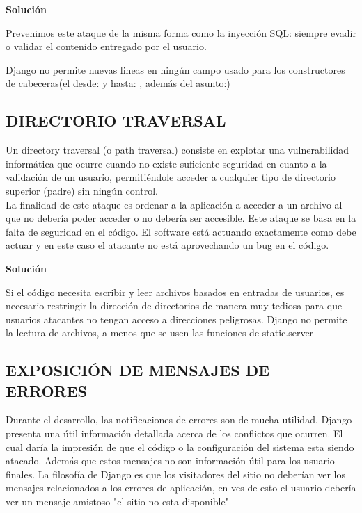 \textbf{Solución}

Prevenimos este ataque de la misma forma como la inyección SQL: siempre evadir o validar el contenido entregado por el usuario.

Django no permite nuevas lineas en ningún campo usado para los constructores de cabeceras(el desde: y hasta: , además del asunto:)

\subsection{DIRECTORIO TRAVERSAL}

Un directory traversal (o path traversal) consiste en explotar una vulnerabilidad informática que ocurre cuando no existe suficiente seguridad en cuanto a la validación de un usuario, permitiéndole acceder a cualquier tipo de directorio superior (padre) sin ningún control.\\

La finalidad de este ataque es ordenar a la aplicación a acceder a un archivo al que no debería poder acceder o no debería ser accesible. Este ataque se basa en la falta de seguridad en el código. El software está actuando exactamente como debe actuar y en este caso el atacante no está aprovechando un bug en el código.

\textbf{Solución}

Si el código necesita escribir y leer archivos basados en entradas de usuarios, es necesario restringir la dirección de directorios de manera muy tediosa para que usuarios atacantes no tengan acceso a direcciones peligrosas.
Django no permite la lectura de archivos, a menos que se usen las funciones de static.server

\subsection{EXPOSICIÓN DE MENSAJES DE ERRORES}

Durante el desarrollo, las notificaciones de errores son de mucha utilidad. Django presenta una útil información detallada acerca de los conflictos que ocurren.
El cual daría la impresión de que el código o la configuración del sistema esta siendo atacado.
Además que estos mensajes no son información útil para los usuario finales. La filosofía de Django es que los visitadores del sitio no deberían ver los mensajes relacionados a los errores de aplicación, en ves de esto el usuario debería ver un mensaje amistoso "el sitio no esta disponible" 


